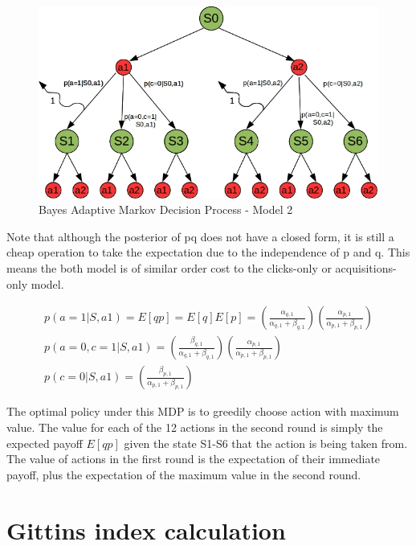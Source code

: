 \documentclass[11pt,a4,singlespacing,titlepagenumber=on]{scrreprt}
\numberwithin{equation}{chapter} %
\theoremstyle{remark}
\begin{document}
\begin{figure}[H]
    \centering
    \includegraphics[scale=0.6]{BAMDP.jpg}
    \caption{ Bayes Adaptive Markov Decision Process - Model 2 }
\end{figure}


Note that although the posterior of pq does not have a closed form, it is still a cheap operation to take the expectation due to the independence of p and q. This means the both model is of similar order cost to the clicks-only or acquisitions-only model.

\begin{align}
	p(a=1|S,a1) = E[qp] = E[q]E[p] = 
		\left( \frac{ \alpha_{q,1} }{ \alpha_{q,1} + \beta_{q,1} } \right)
		\left( \frac{ \alpha_{p,1} }{ \alpha_{p,1} + \beta_{p,1} } \right) \\
	p(a=0,c=1|S,a1) = 
		\left( \frac{ \beta_{q,1} }{ \alpha_{q,1} + \beta_{q,1} } \right)
		\left( \frac{ \alpha_{p,1} }{ \alpha_{p,1} + \beta_{p,1} } \right) \\
	p(c=0|S,a1) = 
		\left( \frac{ \beta_{p,1} }{ \alpha_{p,1} + \beta_{p,1} } \right) 
\end{align}	

The optimal policy under this MDP is to greedily choose action with maximum value. The value for each of the 12 actions in the second round is simply the expected payoff $E[qp]$ given the state S1-S6 that the action is being taken from. The value of actions in the first round is the expectation of their immediate payoff, plus the expectation of the maximum value in the second round.

\section{Gittins index calculation}
\end{document}
